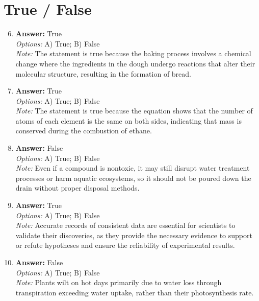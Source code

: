 \documentclass[12pt]{article}
\begin{document}
\section*{True / False}
\begin{enumerate}[label=\arabic*.]
\setcounter{enumi}{5}
\item \textbf{Answer:} True
\\ \textit{Options:} A) True; B) False
\\ \textit{Note:} The statement is true because the baking process involves a chemical change where the ingredients in the dough undergo reactions that alter their molecular structure, resulting in the formation of bread.
\item \textbf{Answer:} True
\\ \textit{Options:} A) True; B) False
\\ \textit{Note:} The statement is true because the equation shows that the number of atoms of each element is the same on both sides, indicating that mass is conserved during the combustion of ethane.
\item \textbf{Answer:} False
\\ \textit{Options:} A) True; B) False
\\ \textit{Note:} Even if a compound is nontoxic, it may still disrupt water treatment processes or harm aquatic ecosystems, so it should not be poured down the drain without proper disposal methods.
\item \textbf{Answer:} True
\\ \textit{Options:} A) True; B) False
\\ \textit{Note:} Accurate records of consistent data are essential for scientists to validate their discoveries, as they provide the necessary evidence to support or refute hypotheses and ensure the reliability of experimental results.
\item \textbf{Answer:} False
\\ \textit{Options:} A) True; B) False
\\ \textit{Note:} Plants wilt on hot days primarily due to water loss through transpiration exceeding water uptake, rather than their photosynthesis rate.
\end{enumerate}
\end{document}
